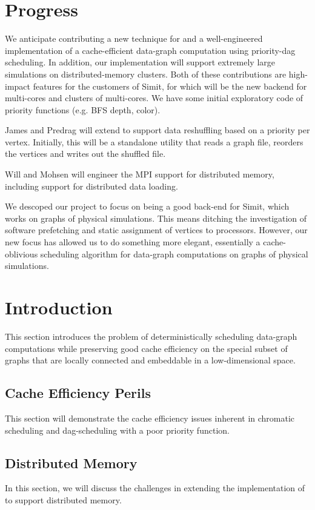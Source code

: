 \section{Progress}
\label{sec:progress}


We anticipate contributing a new technique for and a well-engineered
implementation of a cache-efficient data-graph computation using
priority-dag scheduling.  In addition, our implementation will support
extremely large simulations on distributed-memory clusters.  Both
of these contributions are high-impact features for the customers
of Simit, for which  will be the new backend for multi-cores
and clusters of multi-cores.  We have some initial exploratory code
of priority functions (e.g. BFS depth, color).  


James and Predrag will extend  to support data reshuffling
based on a priority per vertex.  Initially, this will be a standalone
utility that reads a graph file, reorders the vertices and writes out
the shuffled file.  

Will and Mohsen will engineer the MPI support for distributed memory,
including support for distributed data loading.


We descoped our project to focus on being a good back-end for Simit, which
works on graphs of physical simulations.  This means ditching the investigation
of software prefetching and static assignment of vertices to processors.
However, our new focus has allowed us to do something more elegant, essentially
a cache-oblivious scheduling algorithm for data-graph computations on graphs
of physical simulations.

\section{Introduction}
\label{sec:intro}

This section introduces the problem of deterministically scheduling data-graph
computations while preserving good cache efficiency on the special subset of graphs
that are locally connected and embeddable in a low-dimensional space.  

\subsection{Cache Efficiency Perils}

This section will demonstrate the cache efficiency issues inherent in chromatic
scheduling and dag-scheduling with a poor priority function.  

\subsection{Distributed Memory}

In this section, we will discuss
the challenges in extending the implementation of  to support
distributed memory. 
